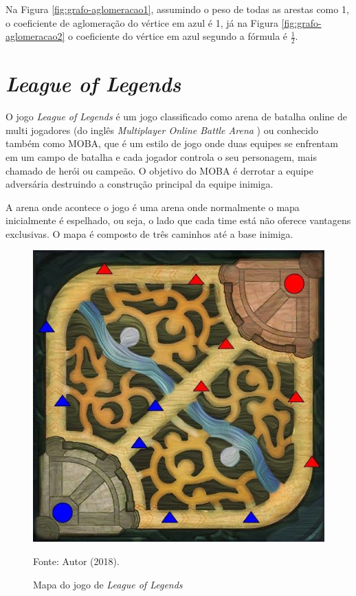 Na Figura \ref{fig:grafo-aglomeracao1}, assumindo o peso de todas as arestas como 1, o coeficiente de aglomeração do vértice em azul é 1, já na Figura \ref{fig:grafo-aglomeracao2} o coeficiente do vértice em azul segundo a fórmula é $\frac{1}{2}$. 
    


\section{\textit{League of Legends}}
\label{chap:lol}
O jogo \textit{League of Legends} é um jogo classificado como arena de batalha online de multi jogadores (do inglês \textit{Multiplayer Online Battle Arena} ) ou conhecido também como MOBA, que é um estilo de jogo onde duas equipes se enfrentam em um campo de batalha e cada jogador controla o seu personagem, mais chamado de herói ou campeão. O objetivo do MOBA é derrotar a equipe adversária destruindo a construção principal da equipe inimiga.

	A arena onde acontece o jogo é uma arena onde normalmente o mapa inicialmente é  espelhado,  ou  seja, o lado que cada time está não  oferece vantagens  exclusivas.  O mapa é composto  de  três caminhos até a base inimiga.
    

\begin{figure}[H]
	\caption{Mapa do jogo de \textit{League of Legends}}
	\begin{center}
		\includegraphics{imagens/mapa_lol.jpg}
	\end{center}
	\small{Fonte: Autor (2018).}
	\label{fig:mapa_lol}
\end{figure}


